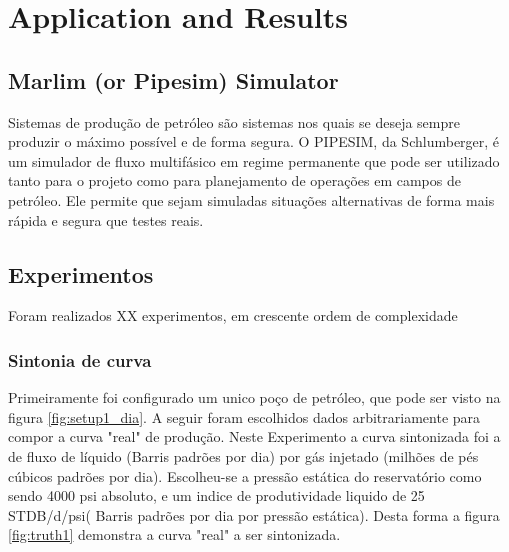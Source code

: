 
\chapter{Application and Results} \label{chap:4}


\section{Marlim (or Pipesim) Simulator}
Sistemas de produção de petróleo são sistemas nos quais se deseja sempre produzir o máximo possível e de forma segura.
O PIPESIM, da Schlumberger, é um simulador de fluxo multifásico em regime permanente que pode ser utilizado tanto para o projeto como para planejamento de operações em campos de petróleo. Ele permite que sejam simuladas situações alternativas de forma mais rápida e segura que testes reais.



\section{Experimentos}
Foram realizados XX experimentos, em crescente ordem de complexidade

\subsection{Sintonia de curva }
Primeiramente foi configurado um unico poço de petróleo, que pode ser visto na figura \ref{fig:setup1_dia}. A seguir foram escolhidos dados arbitrariamente para compor a curva "real" de produção.
Neste Experimento a curva sintonizada foi a de fluxo de líquido (Barris padrões por dia) por gás injetado (milhões de pés cúbicos padrões por dia). Escolheu-se a pressão estática do reservatório como sendo 4000 psi absoluto, e um indice de produtividade liquido de 25 STDB/d/psi( Barris padrões por dia por pressão estática). Desta forma a figura \ref{fig:truth1} demonstra a curva "real" a ser sintonizada.

